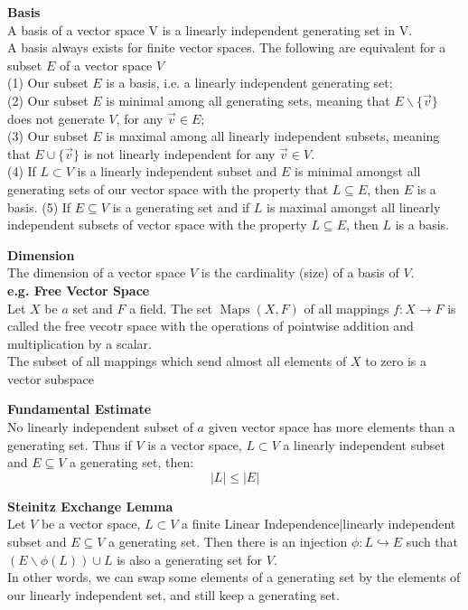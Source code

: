 \documentclass[a4paper, 10pt]{article}
\begin{document}
\begin{multicols*}{3}
\textbf{Basis}\\
A basis of a vector space V is a linearly independent generating set in V.\\
A basis always exists for finite vector spaces. 
The following are equivalent for a subset $E$ of a vector space $V$\\
(1) Our subset $E$ is a basis, i.e. a linearly independent generating set;\\
(2) Our subset $E$ is minimal among all generating sets, meaning that $E \backslash\{\vec{v}\}$ does not generate $V$, for any $\vec{v} \in E$;\\
(3) Our subset $E$ is maximal among all linearly independent subsets, meaning that $E \cup\{\vec{v}\}$ is not linearly independent for any $\vec{v} \in V$.\\
(4) If $L \subset V$ is a linearly independent subset and $E$ is minimal amongst all generating sets of our vector space with the property that $L \subseteq E$, then $E$ is a basis.
(5) If $E \subseteq V$ is a generating set and if $L$ is maximal amongst all linearly independent subsets of vector space with the property $L \subseteq E$, then $L$ is a basis.

\textbf{Dimension}\\
The dimension of a vector space $V$ is the cardinality (size) of a basis of $V$.\\

\textbf{e.g. Free Vector Space}\\
Let $X$ be $a$ set and $F$ a field. The set $\operatorname{Maps}(X, F)$ of all mappings $f: X \rightarrow F$ is called the free vecotr space with the operations of pointwise addition and multiplication by a scalar. \\
The subset of all mappings which send almost all elements of $X$ to zero is a vector subspace

\textbf{Fundamental Estimate}\\
No linearly independent subset of $a$ given vector space has more elements than a generating set. Thus if $V$ is a vector space, $L \subset V$ a linearly independent subset and $E \subseteq V$ a generating set, then:
$$
|L| \leqslant|E|
$$

\textbf{Steinitz Exchange Lemma}\\
Let $V$ be a vector space, $L \subset V$ a finite Linear Independence|linearly independent subset and $E \subseteq V$ a generating set. Then there is an injection $\phi: L \hookrightarrow E$ such that $(E \backslash \phi(L)) \cup L$ is also a generating set for $V$.\\
In other words, we can swap some elements of a generating set by the elements of our linearly independent set, and still keep a generating set.


\end{multicols*}
\end{document}
